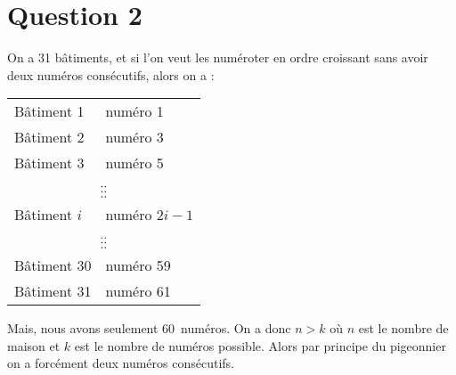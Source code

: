 \newpage
\section*{Question 2}
On a 31 bâtiments, et si l’on veut les numéroter en ordre croissant sans avoir deux numéros consécutifs, alors on a :

\begin{center}
	\begin{tabular}{l@{ $\rightarrow$ }l}
		 Bâtiment 1  & numéro 1                                          \\
		 Bâtiment 2  & numéro 3                                          \\
		 Bâtiment 3  & numéro 5                                          \\
		\multicolumn{2}{c}{$\hfill\vdots\hfill\hfill\hfill\vdots\hfill\hfill$} \\
		Bâtiment $i$ & numéro $2 i - 1$                                  \\
		\multicolumn{2}{c}{$\hfill\vdots\hfill\hfill\hfill\vdots\hfill\hfill$} \\
		Bâtiment 30  & numéro 59                                         \\
		Bâtiment 31  & numéro 61
	\end{tabular}
	\end{center}

Mais, nous avons seulement 60~numéros. On a donc $n > k$ où $n$ est le nombre de maison et $k$ est le nombre de numéros possible. Alors par principe du pigeonnier on a forcément deux numéros consécutifs.